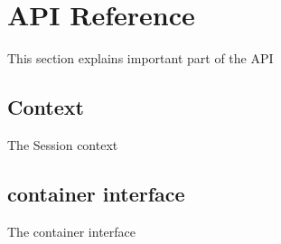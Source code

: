 \documentclass[12pt,a4paper]{report}
\begin{document}
\chapter{API Reference}
\label{sec:APIReference}

This section explains important part of the API

\section{Context}
\label{sec:Context}

The Session context


\section{container interface}
\label{sec:containerInterface}
The container interface
\end{document}
